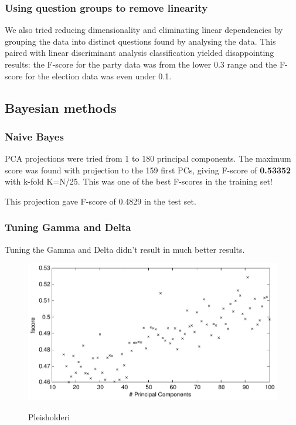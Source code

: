 \documentclass[a4paper,10pt]{article}
\begin{document}
\subsubsection{Using question groups to remove linearity}
We also tried reducing dimensionality and eliminating linear dependencies by grouping the data into distinct questions found by analysing the data. This paired with linear discriminant analysis classification yielded disappointing results: the F-score for the party data was from the lower 0.3 range and the F-score for the election data was even under 0.1.

\subsection{Bayesian methods}
\subsubsection{Naive Bayes}
PCA projections were tried from 1 to 180 principal components. The maximum score was found with projection to the 159 first PCs, giving F-score of {\bf 0.53352} with k-fold K=N/25. This was one of the best F-scores in the training set!

This projection gave F-score of 0.4829 in the test set.

\subsubsection{Tuning Gamma and Delta}
Tuning the Gamma and Delta didn’t result in much better results.

\begin{figure}
\begin{center}
	\caption{Pleisholderi}
	{\includegraphics[scale=0.5,angle=0]{./img/bayes_gamma_pca1.pdf}}
	\label{fig:bayesGamma1}
\end{center}
\end{figure}
\end{document}
